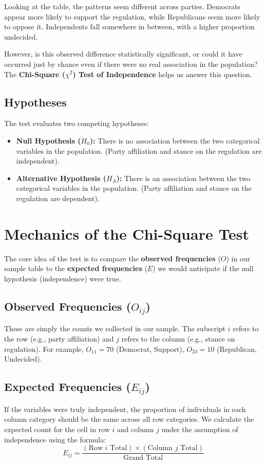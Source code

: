 \documentclass{article}
\begin{document}
Looking at the table, the patterns seem different across parties. Democrats appear more likely to support the regulation, while Republicans seem more likely to oppose it. Independents fall somewhere in between, with a higher proportion undecided.

However, is this observed difference statistically significant, or could it have occurred just by chance even if there were no real association in the population? The \textbf{Chi-Square ($\chi^2$) Test of Independence} helps us answer this question.

\subsection{Hypotheses}
The test evaluates two competing hypotheses:
\begin{itemize}
    \item \textbf{Null Hypothesis ($H_0$):} There is no association between the two categorical variables in the population. (Party affiliation and stance on the regulation are independent).
    \item \textbf{Alternative Hypothesis ($H_A$):} There is an association between the two categorical variables in the population. (Party affiliation and stance on the regulation are dependent).
\end{itemize}

\section{Mechanics of the Chi-Square Test}

The core idea of the test is to compare the \textbf{observed frequencies} ($O$) in our sample table to the \textbf{expected frequencies} ($E$) we would anticipate if the null hypothesis (independence) were true.

\subsection{Observed Frequencies ($O_{ij}$)}
These are simply the counts we collected in our sample. The subscript $i$ refers to the row (e.g., party affiliation) and $j$ refers to the column (e.g., stance on regulation). For example, $O_{11} = 70$ (Democrat, Support), $O_{23} = 10$ (Republican, Undecided).

\subsection{Expected Frequencies ($E_{ij}$)}
If the variables were truly independent, the proportion of individuals in each column category should be the same across all row categories. We calculate the expected count for the cell in row $i$ and column $j$ under the assumption of independence using the formula:
$$ E_{ij} = \frac{(\text{Row } i \text{ Total}) \times (\text{Column } j \text{ Total})}{\text{Grand Total}} $$
\end{document}
